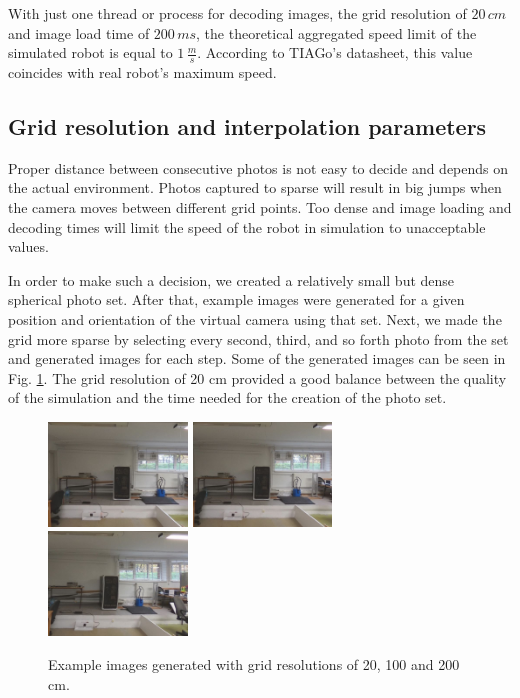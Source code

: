 \documentclass{svproc}
\begin{document}
With just one thread or process for decoding images, the grid resolution of $20\,cm$ and image load time of $200\,ms$, the theoretical aggregated speed limit of the simulated robot is equal to $1\,\frac{m}{s}$.
According to TIAGo's datasheet, this value coincides with real robot's maximum speed.

\subsection{Grid resolution and interpolation parameters}

Proper distance between consecutive photos is not easy to decide and depends on the
actual environment. Photos captured to sparse will result in big jumps when the camera
moves between different grid points. Too dense and image loading and decoding
times will limit the speed of the robot in simulation to unacceptable values.

In order to make such a decision, we created a relatively small but dense spherical photo set.
After that, example images were generated for a given position and orientation of the virtual camera using that set.
Next, we made the grid more sparse by selecting every second, third, and so forth photo from the set and generated images for each step.
Some of the generated images can be seen in Fig. \ref{fig:grid_sizes}.
The grid resolution of 20 cm provided a good balance between the quality of the simulation and the time needed for the creation of the photo set.

\begin{figure}[!ht]
    \centering
    \includegraphics[width=0.33\textwidth]{img/grid_sizes/10}\hfill%
    \includegraphics[width=0.33\textwidth]{img/grid_sizes/50}\hfill%
    \includegraphics[width=0.33\textwidth]{img/grid_sizes/100}\\
    \caption{Example images generated with grid resolutions of 20, 100 and 200 cm.}
    \label{fig:grid_sizes}
\end{figure}
\end{document}
